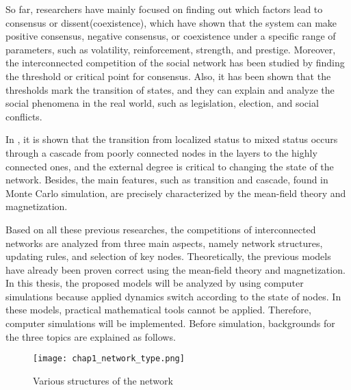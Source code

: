 So far, researchers have mainly focused on finding out which factors lead to consensus or dissent(coexistence), which have shown that the system can make positive consensus, negative consensus, or coexistence under a specific range of parameters, such as volatility, reinforcement, strength, and prestige\parencite{alvarez2016}. Moreover, the interconnected competition of the social network has been studied by finding the threshold or critical point for consensus\parencite{alvarez2016, gomez2015, diep2017}. Also, it has been shown that the thresholds mark the transition of states, and they can explain and analyze the social phenomena in the real world, such as legislation, election, and social conflicts\parencite{alvarez2016, gomez2015, amato2017, diep2017}.

In \parencite{gomez2015}, it is shown that the transition from localized status to mixed status occurs through a cascade from poorly connected nodes in the layers to the highly connected ones, and the external degree is critical to changing the state of the network. Besides, the main features, such as transition and cascade, found in Monte Carlo simulation, are precisely characterized by the mean-field theory and magnetization\parencite{alvarez2016, diep2017, amato2017, gomez2015}.

Based on all these previous researches, the competitions of interconnected networks are analyzed from three main aspects, namely network structures, updating rules, and selection of key nodes. Theoretically, the previous models have already been proven correct using the mean-field theory and magnetization. In this thesis, the proposed models will be analyzed by using computer simulations because applied dynamics switch according to the state of nodes. In these models, practical mathematical tools cannot be applied\parencite{nicolas2017, rainer2002}. Therefore, computer simulations will be implemented. Before simulation, backgrounds for the three topics are explained as follows. 

\begin{figure}[!htb]
	\centering
	\texttt{[image: chap1\_network\_type.png]}
	\caption{Various structures of the network}
	\label{chap1_network_type}
\end{figure}

